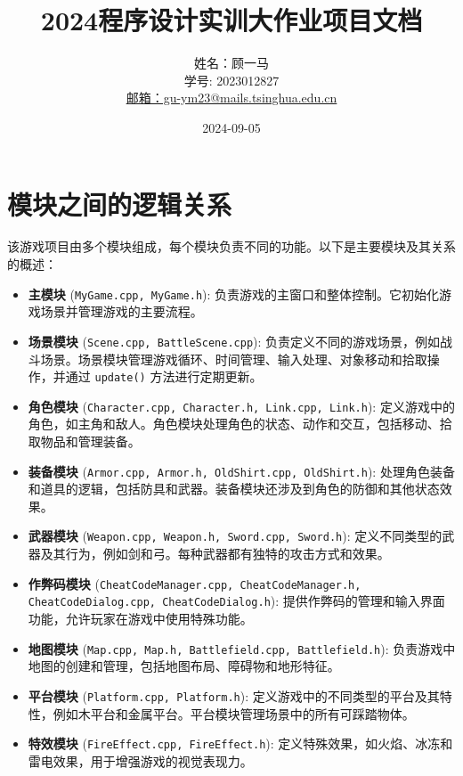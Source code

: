 \documentclass[UTF8]{ctexart}
\begin{document}
\sloppy
	
\title{2024程序设计实训大作业项目文档}
\author{ 
    姓名：顾一马 \\ %
    学号: 2023012827 \\ %
    \href{mailto:gu-ym23@mails.tsinghua.edu.cn}{邮箱：gu-ym23@mails.tsinghua.edu.cn} %
}
\date{2024-09-05}

\maketitle

\tableofcontents
\newpage

\section{模块之间的逻辑关系}
该游戏项目由多个模块组成，每个模块负责不同的功能。以下是主要模块及其关系的概述：

\begin{itemize}
    \item \textbf{主模块} (\texttt{MyGame.cpp, MyGame.h}): 负责游戏的主窗口和整体控制。它初始化游戏场景并管理游戏的主要流程。
    \item \textbf{场景模块} (\texttt{Scene.cpp, BattleScene.cpp}): 负责定义不同的游戏场景，例如战斗场景。场景模块管理游戏循环、时间管理、输入处理、对象移动和拾取操作，并通过 \texttt{update()} 方法进行定期更新。
    \item \textbf{角色模块} (\texttt{Character.cpp, Character.h, Link.cpp, Link.h}): 定义游戏中的角色，如主角和敌人。角色模块处理角色的状态、动作和交互，包括移动、拾取物品和管理装备。
    \item \textbf{装备模块} (\texttt{Armor.cpp, Armor.h, OldShirt.cpp, OldShirt.h}): 处理角色装备和道具的逻辑，包括防具和武器。装备模块还涉及到角色的防御和其他状态效果。
    \item \textbf{武器模块} (\texttt{Weapon.cpp, Weapon.h, Sword.cpp, Sword.h}): 定义不同类型的武器及其行为，例如剑和弓。每种武器都有独特的攻击方式和效果。
    \item \textbf{作弊码模块} (\texttt{CheatCodeManager.cpp, CheatCodeManager.h, CheatCodeDialog.cpp, CheatCodeDialog.h}): 提供作弊码的管理和输入界面功能，允许玩家在游戏中使用特殊功能。
    \item \textbf{地图模块} (\texttt{Map.cpp, Map.h, Battlefield.cpp, Battlefield.h}): 负责游戏中地图的创建和管理，包括地图布局、障碍物和地形特征。
    \item \textbf{平台模块} (\texttt{Platform.cpp, Platform.h}): 定义游戏中的不同类型的平台及其特性，例如木平台和金属平台。平台模块管理场景中的所有可踩踏物体。
    \item \textbf{特效模块} (\texttt{FireEffect.cpp, FireEffect.h}): 定义特殊效果，如火焰、冰冻和雷电效果，用于增强游戏的视觉表现力。
\end{itemize}
\end{document}
